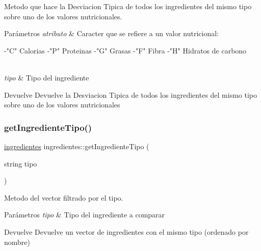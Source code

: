 Metodo que hace la Desviacion Tipica de todos los ingredientes del mismo tipo sobre uno de los valores nutricionales. 


\begin{DoxyParams}{Parámetros}
{\em atributo} & Caracter que se refiere a un valor nutricional\+: \begin{DoxyVerb}    -"C" Calorias
    -"P" Proteinas
    -"G" Grasas
    -"F" Fibra
    -"H" Hidratos de carbono
\end{DoxyVerb}
\\
\hline
{\em tipo} & Tipo del ingrediente \\
\hline
\end{DoxyParams}
\begin{DoxyReturn}{Devuelve}
Devuelve la Desviacion Tipica de todos los ingredientes del mismo tipo sobre uno de los valores nutricionales 
\end{DoxyReturn}
\mbox{\label{classingredientes_a160ecb07facb16cbe7369ea797c67549}} 
\subsubsection{\texorpdfstring{get\+Ingrediente\+Tipo()}{getIngredienteTipo()}}
{\footnotesize\ttfamily \hyperlink{classingredientes}{ingredientes} ingredientes\+::get\+Ingrediente\+Tipo (\begin{DoxyParamCaption}\item[{string}]{tipo }\end{DoxyParamCaption})}



Metodo del vector filtrado por el tipo. 


\begin{DoxyParams}{Parámetros}
{\em tipo} & Tipo del ingrediente a comparar \\
\hline
\end{DoxyParams}
\begin{DoxyReturn}{Devuelve}
Devuelve un vector de ingredientes con el mismo tipo (ordenado por nombre) 
\end{DoxyReturn}
\mbox{\label{classingredientes_a6e4cfe264fddd851ccf2f2061d6b66ce}} 

